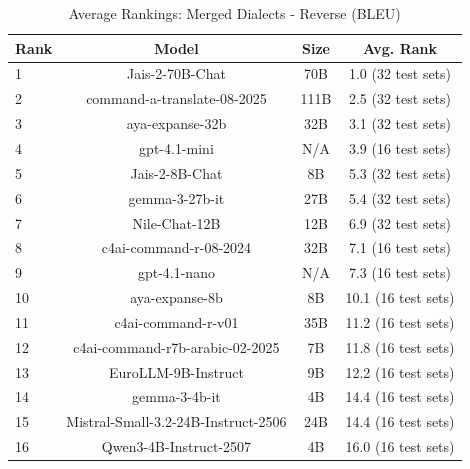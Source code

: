 \begin{table}[htbp]
\centering
\caption{Average Rankings: Merged Dialects - Reverse (BLEU)}
\label{tab:avg_rankings_bleu}
\begin{tabular}{l@{\hspace{3pt}}c@{\hspace{3pt}}c@{\hspace{3pt}}c}
\toprule
Rank & Model & Size & Avg. Rank \\
\midrule
1 & Jais-2-70B-Chat & 70B & 1.0 (32 test sets) \\
2 & command-a-translate-08-2025 & 111B & 2.5 (32 test sets) \\
3 & aya-expanse-32b & 32B & 3.1 (32 test sets) \\
4 & gpt-4.1-mini & N/A & 3.9 (16 test sets) \\
5 & Jais-2-8B-Chat & 8B & 5.3 (32 test sets) \\
6 & gemma-3-27b-it & 27B & 5.4 (32 test sets) \\
7 & Nile-Chat-12B & 12B & 6.9 (32 test sets) \\
8 & c4ai-command-r-08-2024 & 32B & 7.1 (16 test sets) \\
9 & gpt-4.1-nano & N/A & 7.3 (16 test sets) \\
10 & aya-expanse-8b & 8B & 10.1 (16 test sets) \\
11 & c4ai-command-r-v01 & 35B & 11.2 (16 test sets) \\
12 & c4ai-command-r7b-arabic-02-2025 & 7B & 11.8 (16 test sets) \\
13 & EuroLLM-9B-Instruct & 9B & 12.2 (16 test sets) \\
14 & gemma-3-4b-it & 4B & 14.4 (16 test sets) \\
15 & Mistral-Small-3.2-24B-Instruct-2506 & 24B & 14.4 (16 test sets) \\
16 & Qwen3-4B-Instruct-2507 & 4B & 16.0 (16 test sets) \\
\bottomrule
\end{tabular}
\end{table}